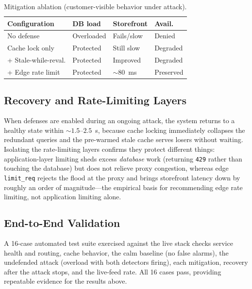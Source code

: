 \documentclass[conference]{IEEEtran}
\begin{document}
\begin{table}[t]
\centering
\caption{Mitigation ablation (customer-visible behavior under attack).}
\label{tab:ablation}
\footnotesize
\begin{tabular}{@{}L{2.4cm}L{1.7cm}L{1.6cm}L{1.4cm}@{}}
\toprule
Configuration & DB load & Storefront & Avail. \\
\midrule
No defense & Overloaded & Fails/slow & Denied \\
Cache lock only & Protected & Still slow & Degraded \\
+ Stale-while-reval. & Protected & Improved & Degraded \\
+ Edge rate limit & Protected & ${\sim}80$~ms & Preserved \\
\bottomrule
\end{tabular}
\end{table}

\subsection{Recovery and Rate-Limiting Layers}
When defenses are enabled during an ongoing attack, the system returns to a healthy
state within ${\sim}1.5$--$2.5$~s, because cache locking immediately collapses the
redundant queries and the pre-warmed stale cache serves losers without waiting.
Isolating the rate-limiting layers confirms they protect different things:
application-layer limiting sheds excess \emph{database} work (returning \texttt{429}
rather than touching the database) but does not relieve proxy congestion, whereas edge
\texttt{limit\_req} rejects the flood at the proxy and brings storefront latency down
by roughly an order of magnitude---the empirical basis for recommending edge rate
limiting, not application limiting alone.

\subsection{End-to-End Validation}
A 16-case automated test suite exercised against the live stack checks service health
and routing, cache behavior, the calm baseline (no false alarms), the undefended
attack (overload with both detectors firing), each mitigation, recovery after the
attack stops, and the live-feed rate. All 16 cases pass, providing repeatable evidence
for the results above.
\end{document}

